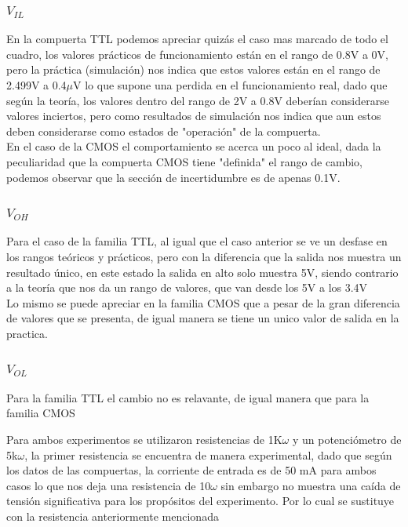 \documentclass[journal]{IEEEtran}
\begin{document}
	\subsubsection{$V_{IL}$}
	En la compuerta TTL podemos apreciar quizás el caso mas marcado de todo el cuadro,  los valores prácticos de funcionamiento están en el rango de 0.8V a 0V, pero la práctica (simulación) nos indica que estos valores están en el rango de 2.499V a 0.4$\mu$V lo que supone una perdida en el funcionamiento real, dado que según la teoría, los valores dentro del rango de 2V a 0.8V deberían considerarse valores inciertos, pero como resultados de simulación nos indica que aun estos deben considerarse como estados de "operación" de la compuerta.
	\\
	En el caso de la CMOS el comportamiento se acerca un poco al ideal, dada la peculiaridad que la compuerta CMOS tiene "definida" el rango de cambio, podemos observar que la sección de incertidumbre es de apenas 0.1V.
	
	\subsubsection{$V_{OH}$}
	Para el caso de la familia TTL, al igual que el caso anterior se ve un desfase en los rangos teóricos y prácticos, pero con la diferencia que la salida nos muestra un resultado único, en este estado la salida en alto solo muestra 5V, siendo contrario a la teoría que nos da un rango de valores, que van desde los 5V a los 3.4V
	\\
	Lo mismo se puede apreciar en la familia CMOS que a pesar de la gran diferencia de valores que se presenta, de igual manera se tiene un unico valor de salida en la practica.
	
	\subsubsection{$V_{OL}$}
	Para la familia TTL el cambio no es relavante, de igual manera que para la familia CMOS
	
	
	Para ambos experimentos se utilizaron resistencias de 1K$\omega$ y un potenciómetro de 5k$\omega$, la primer resistencia se encuentra de manera experimental, dado que según los datos de las compuertas, la corriente de entrada es de 50 mA para ambos casos lo que nos deja una resistencia de 10$\omega$ sin embargo no muestra una caída de tensión significativa para los propósitos del experimento. Por lo cual se sustituye con la resistencia anteriormente mencionada
	
\end{document}
